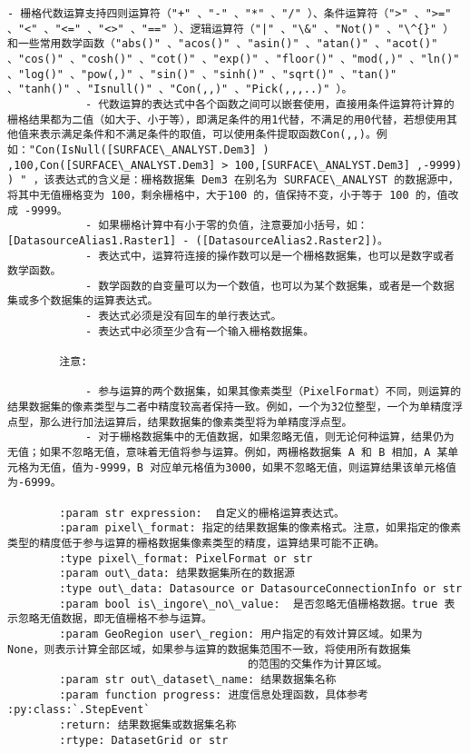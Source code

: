 \documentclass[11pt]{article}
\begin{document}
\begin{Verbatim}[commandchars=\\\{\}]
            - 栅格代数运算支持四则运算符（"+" 、"-" 、"*" 、"/" ）、条件运算符（">" 、">=" 、"<" 、"<=" 、"<>" 、"==" ）、逻辑运算符（"|" 、"\&" 、"Not()" 、"\^{}" ）和一些常用数学函数（"abs()" 、"acos()" 、"asin()" 、"atan()" 、"acot()" 、"cos()" 、"cosh()" 、"cot()" 、"exp()" 、"floor()" 、"mod(,)" 、"ln()" 、"log()" 、"pow(,)" 、"sin()" 、"sinh()" 、"sqrt()" 、"tan()" 、"tanh()" 、"Isnull()" 、"Con(,,)" 、"Pick(,,,..)" ）。
            - 代数运算的表达式中各个函数之间可以嵌套使用，直接用条件运算符计算的栅格结果都为二值（如大于、小于等），即满足条件的用1代替，不满足的用0代替，若想使用其他值来表示满足条件和不满足条件的取值，可以使用条件提取函数Con(,,)。例如："Con(IsNull([SURFACE\_ANALYST.Dem3] ) ,100,Con([SURFACE\_ANALYST.Dem3] > 100,[SURFACE\_ANALYST.Dem3] ,-9999) ) " ，该表达式的含义是：栅格数据集 Dem3 在别名为 SURFACE\_ANALYST 的数据源中，将其中无值栅格变为 100，剩余栅格中，大于100 的，值保持不变，小于等于 100 的，值改成 -9999。
            - 如果栅格计算中有小于零的负值，注意要加小括号，如：[DatasourceAlias1.Raster1] - ([DatasourceAlias2.Raster2])。
            - 表达式中，运算符连接的操作数可以是一个栅格数据集，也可以是数字或者数学函数。
            - 数学函数的自变量可以为一个数值，也可以为某个数据集，或者是一个数据集或多个数据集的运算表达式。
            - 表达式必须是没有回车的单行表达式。
            - 表达式中必须至少含有一个输入栅格数据集。
        
        注意:
        
            - 参与运算的两个数据集，如果其像素类型（PixelFormat）不同，则运算的结果数据集的像素类型与二者中精度较高者保持一致。例如，一个为32位整型，一个为单精度浮点型，那么进行加法运算后，结果数据集的像素类型将为单精度浮点型。
            - 对于栅格数据集中的无值数据，如果忽略无值，则无论何种运算，结果仍为无值；如果不忽略无值，意味着无值将参与运算。例如，两栅格数据集 A 和 B 相加，A 某单元格为无值，值为-9999，B 对应单元格值为3000，如果不忽略无值，则运算结果该单元格值为-6999。
        
        :param str expression:  自定义的栅格运算表达式。
        :param pixel\_format: 指定的结果数据集的像素格式。注意，如果指定的像素类型的精度低于参与运算的栅格数据集像素类型的精度，运算结果可能不正确。
        :type pixel\_format: PixelFormat or str
        :param out\_data: 结果数据集所在的数据源
        :type out\_data: Datasource or DatasourceConnectionInfo or str
        :param bool is\_ingore\_no\_value:  是否忽略无值栅格数据。true 表示忽略无值数据，即无值栅格不参与运算。
        :param GeoRegion user\_region: 用户指定的有效计算区域。如果为 None，则表示计算全部区域，如果参与运算的数据集范围不一致，将使用所有数据集
                                     的范围的交集作为计算区域。
        :param str out\_dataset\_name: 结果数据集名称
        :param function progress: 进度信息处理函数，具体参考 :py:class:`.StepEvent`
        :return: 结果数据集或数据集名称
        :rtype: DatasetGrid or str
    

\end{Verbatim}
\end{document}
